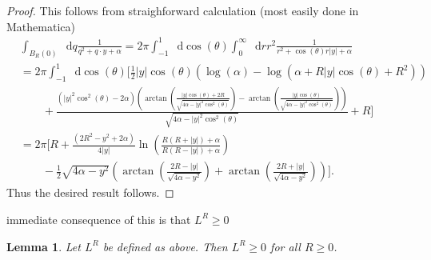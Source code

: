 \documentclass[a4paper,11pt]{article}
\newcommand{\abs}[1]{\left\lvert #1 \right\rvert}
\newcommand*\diff{\mathop{}\!\mathrm{d}}
\newtheorem{lemma}{Lemma}
\numberwithin{equation}{section}
\begin{document}
\begin{proof}
	This follows from straighforward calculation (most easily done in Mathematica)\begin{equation}
	\begin{aligned}
	&\int_{B_R(0)}\diff q\frac{1}{q^2+q\cdot y+\alpha}=2\pi\int_{-1}^{1}\diff \cos(\theta)\int_{0}^{\infty}\diff r r^2\frac{1}{r^2+\cos(\theta)r\abs{y}+\alpha}\\&
	=2\pi\int_{-1}^{1}\diff \cos(\theta)  \Bigg[\frac{1}{2} \left| y\right|  \cos (\theta ) \left(\log (\alpha )-\log \left(\alpha +R \left| y\right|  \cos (\theta )+R^2\right)\right)\\&\qquad+\frac{\left(\left| y\right| ^2 \cos ^2(\theta )-2 \alpha \right) \left(\arctan\left(\frac{\left| y\right|  \cos (\theta )+2 R}{\sqrt{4 \alpha -\left| y\right| ^2 \cos ^2(\theta )}}\right)-\arctan\left(\frac{\left| y\right|  \cos (\theta )}{\sqrt{4 \alpha -\left| y\right| ^2 \cos ^2(\theta )}}\right)\right)}{\sqrt{4 \alpha -\left| y\right| ^2 \cos ^2(\theta )}}+R\Bigg]\\
	&=2\pi \Bigg[R+\frac{(2R^2-y^2+2\alpha)}{4\abs{y}}\ln\left(\frac{R(R+\abs{y})+\alpha}{R(R-\abs{y})+\alpha}\right)\\
	&\qquad-\frac{1}{2}\sqrt{4\alpha-y^2}\left(\arctan\left(\frac{2R-\abs{y}}{\sqrt{4\alpha-y^2}}\right)+\arctan\left(\frac{2R+\abs{y}}{\sqrt{4\alpha-y^2}}\right)\right)\Bigg].
	\end{aligned}
	\end{equation}
	Thus the desired result follows.
\end{proof}
immediate consequence of this is that $ L^R\geq0 $ \begin{lemma}\label{LemmaLgreater0}
	Let $ L^R $ be defined as above. Then $ L^R\geq0 $ for all $ R\geq0 $.
\end{lemma}
\end{document}
